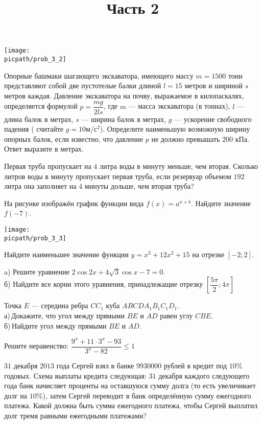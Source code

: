 \begin{training}[1]
\begin{listofex}[resume]
\begin{center}
			\texttt{[image: \\picpath/prob\_3\_2]}
		\end{center}
		\foranswer
		\item Опорные башмаки шагающего экскаватора, имеющего массу \( m=1500 \) тонн представляют собой две пустотелые балки длиной \( l=15 \) метров и шириной \( s \) метров каждая. Давление экскаватора на почву, выражаемое в килопаскалях, определяется формулой \( p=\dfrac{mg}{2ls} \), где \( m \) --- масса экскаватора (в тоннах), \( l \) ---длина балок в метрах, \( s \) --- ширина балок в метрах, \( g \) --- ускорение свободного падения ( считайте \( g=10 \)м/с\( ^2 \)). Определите наименьшую возможную ширину опорных балок, если известно, что давление \( p \) не должно превышать \( 200 \) кПа. Ответ выразите в метрах.
		\foranswer
		\item Первая труба пропускает на \( 4 \) литра воды в минуту меньше, чем вторая. Сколько литров воды в минуту пропускает первая труба, если резервуар объемом \( 192 \) литра она заполняет на 4 минуты дольше, чем вторая труба?
		\foranswer
		\hphantom{Часть 1}
		\item 
		На рисунке изображён график функции вида \( f(x)=a^{x+b} \). Найдите значение \( f(-7) \).
		\begin{center}
			\texttt{[image: \\picpath/prob\_3\_3]}
		\end{center}
		\foranswer
		\item Найдите наименьшее значение функции \( y=x^3+12x^2+15 \) на отрезке \( [-2;2] \).
		\foranswer
		\egepreambtwo
		\title{Часть 2}
		\item a) Решите уравнение \( 2\cos2x+4\sqrt{3}\cos x-7=0	 \). \\
		б) Найдите все корни этого уравнения, принадлежащие отрезку \( \left[ \dfrac{5\pi}{2}; 4\pi \right]  \)
		\hphantom{Часть 1}
		\item Точка \( E \) --- середина ребра \( CC_1 \) куба \( ABCDA_1B_1C_1D_1 \). \\
		а) Докажите, что угол между прямыми \( BE \) и \( AD \) равен углу \( CBE \).\\		
		б) Найдите угол между прямыми \( BE \) и \( AD \).
		\item Решите неравенство: \( \dfrac{9^x+11\cdot3^x-93}{3^x-82}\le1 \)
		\item \( 31 \) декабря \( 2013 \) года Сергей взял в банке \( 9 930 000 \) рублей в кредит под \( 10\% \) годовых. Схема выплаты кредита следующая: \( 31 \) декабря каждого следующего года банк начисляет проценты на оставшуюся сумму долга (то есть увеличивает долг на \( 10\% \)), затем Сергей переводит в банк определённую сумму ежегодного платежа. Какой должна быть сумма ежегодного платежа, чтобы Сергей выплатил долг тремя равными ежегодными платежами?

\end{listofex}
\end{training}
